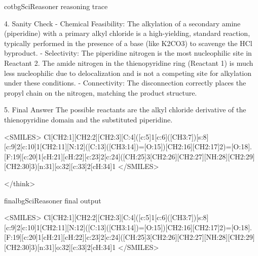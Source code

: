 \begin{appendices}
\begin{fullcotsection}{cotbg}{SciReasoner reasoning trace}
\begin{cotverbatim}
4. Sanity Check
- Chemical Feasibility: The alkylation of a secondary amine (piperidine) with a primary alkyl chloride is a high-yielding, standard reaction, typically performed in the presence of a base (like K2CO3) to scavenge the HCl byproduct.
- Selectivity: The piperidine nitrogen is the most nucleophilic site in Reactant 2. The amide nitrogen in the thienopyridine ring (Reactant 1) is much less nucleophilic due to delocalization and is not a competing site for alkylation under these conditions.
- Connectivity: The disconnection correctly places the propyl chain on the nitrogen, matching the product structure.

5. Final Answer
The possible reactants are the alkyl chloride derivative of the thienopyridine domain and the substituted piperidine.

<SMILES> Cl[CH2:1][CH2:2][CH2:3][C:4]([c:5]1[c:6]([CH3:7])[s:8][c:9]2[c:10]1[CH2:11][N:12]([C:13]([CH3:14])=[O:15])[CH2:16][CH2:17]2)=[O:18].[F:19][c:20]1[cH:21][cH:22][c:23]2[c:24]([CH:25]3[CH2:26][CH2:27][NH:28][CH2:29][CH2:30]3)[n:31][o:32][c:33]2[cH:34]1 </SMILES>

</think>

\end{cotverbatim}

\end{fullcotsection}

\par\medskip

\begin{fullcotsection}{finalbg}{SciReasoner final output}

\begin{cotverbatim}

<SMILES> Cl[CH2:1][CH2:2][CH2:3][C:4]([c:5]1[c:6]([CH3:7])[s:8][c:9]2[c:10]1[CH2:11][N:12]([C:13]([CH3:14])=[O:15])[CH2:16][CH2:17]2)=[O:18].[F:19][c:20]1[cH:21][cH:22][c:23]2[c:24]([CH:25]3[CH2:26][CH2:27][NH:28][CH2:29][CH2:30]3)[n:31][o:32][c:33]2[cH:34]1 </SMILES>

\end{cotverbatim}

\end{fullcotsection}

 

 

 

 

 

 

 

 

 


\end{appendices}
